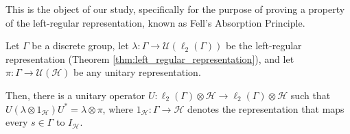 This is the object of our study, specifically for the purpose of proving a property of the left-regular representation, known as Fell's Absorption Principle.
\begin{theorem}
  Let $\Gamma$ be a discrete group, let $\lambda\colon \Gamma\rightarrow \mathcal{U}\left( \ell_2\left( \Gamma \right) \right)$ be the left-regular representation (Theorem \ref{thm:left_regular_representation}), and let $\pi\colon \Gamma\rightarrow \mathcal{U}\left( \mathcal{H} \right)$ be any unitary representation.\newline

  Then, there is a unitary operator $U\colon \ell_2\left( \Gamma \right)\otimes \mathcal{H} \rightarrow \ell_2\left( \Gamma \right)\otimes \mathcal{H}$ such that $U\left( \lambda\otimes 1_{\mathcal{H}} \right) U^{\ast}= \lambda\otimes \pi$, where $1_{\mathcal{H}}\colon \Gamma\rightarrow \mathcal{H}$ denotes the representation that maps every $s\in\Gamma$ to $I_{\mathcal{H}}$.
\end{theorem}
